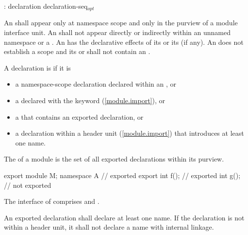 \begin{std.txt}\color{addclr}
  \begin{bnf}\color{addclr}
    :\br
       declaration\br 
       \terminal{\{} declaration-seq${}_{opt}$ \terminal{\}} 
  \end{bnf}

  \pnum
  An  shall appear only
  at namespace scope and only in the purview of a module interface unit. 
  An  shall not appear directly
  or indirectly within an unnamed namespace
  or a .
  An 
  has the declarative effects of its 
  or its  (if any).
  An  does not
  establish a scope and its 
  or 
  shall not contain an .

  \pnum
  A declaration is  if it is
  \begin{itemize}\color{addclr}
  \item a namespace-scope declaration declared within an
        , or
  \item a  declared with
        the  keyword (\ref{module.import}), or
  \item a  that contains an
        exported declaration, or
  \item a declaration within a header unit (\ref{module.import})
        that introduces at least one name.
  \end{itemize}
  The  of a module  is the set of all
  exported declarations within its purview.
  \begin{example}
  \begin{codeblock}
  export module M;
  namespace A {         // exported
    export int f();     // exported
    int g();            // not exported
  }
  \end{codeblock}
  The interface of  comprises  and .
  \end{example}

  \pnum
  An exported declaration shall declare at least one name.
  If the declaration is not within a header unit,
  it shall not declare a name with internal linkage.


\end{std.txt}
